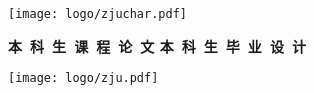 \thispagestyle{empty}
\setcounter{page}{-1}


\vskip 10mm

\begin{center}
    \texttt{[image: logo/zjuchar.pdf]}
\end{center}

\begin{center}
     \heiti \bfseries
    {
        本~科~生~课~程~论~文
    }
    {
        本~科~生~毕~业~设~计
    }
\end{center}

\vskip 20pt

\begin{center}
    \texttt{[image: logo/zju.pdf]}
\end{center}

\vskip 20pt

{
    \newcommand{\CoverTitle}{
        题目      &  \uline{\hfill \Title{} \hfill} \\
    }
}
{
    \newcommand{\CoverTitle}{
        题目      &  \uline{\hfill \TitleLineOne{} \hfill} \\
        ~        & \uline{\hfill \TitleLineTwo{} \hfill} \\
    }
}

